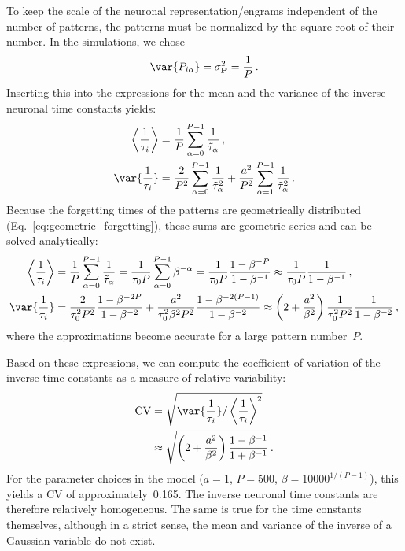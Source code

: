 To keep the scale of the neuronal representation/engrams independent of the number of patterns, the patterns must be normalized by the square root of their number. In the simulations, we chose 
\begin{equation}
    \var{P_{i\alpha}} = \sigma^2_\mathbf{P} = \frac{1}{P} \,.
\end{equation}
Inserting this into the expressions for the mean and the variance of the inverse neuronal time constants yields: 
\begin{equation}
\begin{aligned}
\left< \frac{1}{\tau_i} \right> &= \frac{1}{P} \sum_{\alpha=0}^{P-1} \frac{1}{\tilde{\tau}_\alpha} \,, \\
\var{\frac{1}{\tau_i}} &= \frac{2}{P^2} \sum_{\alpha=0}^{P-1} \frac{1}{\tilde{\tau}_\alpha^2} +  \frac{a^2}{P^2} \sum_{\alpha=1}^{P-1} \frac{1}{\tilde{\tau}_\alpha^2} \,.
\end{aligned}
\end{equation}
Because the forgetting times of the patterns are geometrically distributed (Eq.~\ref{eq:geometric_forgetting}), these sums are geometric series and can be solved analytically: 
\begin{equation}
\begin{aligned}
\left< \frac{1}{\tau_i} \right> &= \frac{1}{P} \sum_{\alpha=0}^{P-1} \frac{1}{\tilde{\tau}_\alpha} = \frac{1}{\tau_0 P} \sum_{\alpha=0}^{P-1} \beta^{-\alpha} = \frac{1}{\tau_0 P} \frac{1-\beta^{-P}}{1-\beta^{-1}} \approx \frac{1}{\tau_0 P} \frac{1}{1-\beta^{-1}} \,, \\
\var{\frac{1}{\tau_i}} &= \frac{2}{\tau_0^2 P^2} \frac{1-\beta^{-2P}}{1-\beta^{-2}} + \frac{a^2}{\tau_0^2 \beta^2 P^2} \frac{1-\beta^{-2(P-1)}}{1-\beta^{-2}} \approx  \left(2 + \frac{a^2}{\beta^2}\right) \frac{1}{\tau_0^2 P^2} \frac{1}{1-\beta^{-2}}  \,,
\end{aligned}
\end{equation}
where the approximations become accurate for a large pattern number~$P$. 

Based on these expressions, we can compute the coefficient of variation of the inverse time constants as a measure of relative variability: 
\begin{equation}
\begin{aligned}
\textrm{CV} &= \sqrt{\var{\frac{1}{\tau_i}}/\left< \frac{1}{\tau_i} \right>^2} \\
&\approx \sqrt{\left(2+\frac{a^2}{\beta^2}\right) \frac{1-\beta^{-1}}{1+\beta^{-1}}} \,.
\end{aligned}
\end{equation}
For the parameter choices in the model ($a=1$, $P=500$, $\beta = 10000^{1/(P-1)}$), this yields a CV of approximately~0.165. The inverse neuronal time constants are therefore relatively homogeneous. The same is true for the time constants themselves, although in a strict sense, the mean and variance of the inverse of a Gaussian variable do not exist. 

